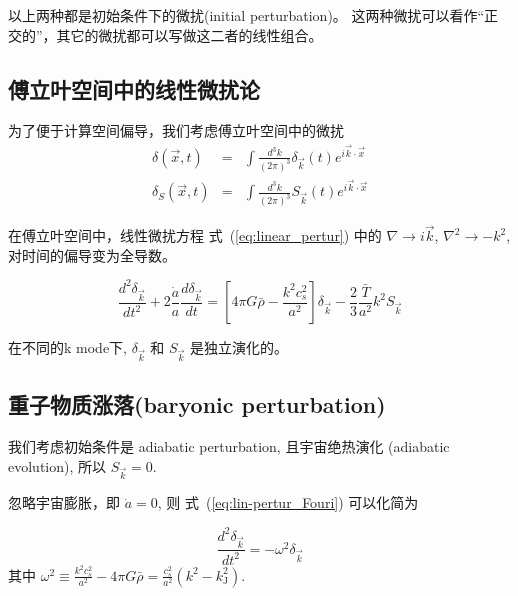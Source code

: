 \documentclass[12pt]{ctexart}
\newcommand{\new}[1]{\textcolor{blue}{#1}}
\newcommand{\refeq}[1]{式~(\ref{#1})}
\begin{document}
以上两种都是初始条件下的微扰(initial perturbation)。
这两种微扰可以看作“正交的”，其它的微扰都可以写做这二者的线性组合。

\subsection{傅立叶空间中的线性微扰论}

为了便于计算空间偏导，我们考虑傅立叶空间中的微扰
\begin{eqnarray}
    \delta\left(\vec{x},t\right) &=& \int \frac{d^3k}{(2\pi)^3} \delta_{\vec{k}}\left(t\right) e^{i\vec{k}\cdot \vec{x}} \\ 
    \delta_S\left(\vec{x},t\right) &=& \int \frac{d^3k}{(2\pi)^3} S_{\vec{k}}\left(t\right) e^{i\vec{k}\cdot \vec{x}}
\end{eqnarray}
\begin{equation}
\end{equation}

在傅立叶空间中，线性微扰方程 \refeq{eq:linear_pertur} 中的 $\nabla \rightarrow i\vec{k}$, $\nabla^2 \rightarrow -k^2$, 对时间的偏导变为全导数。
\begin{shaded}
\begin{equation} \label{eq:lin-pertur_Fouri}
    \frac{d^2 \delta_{\vec{k}}}{dt^2 } + 2\frac{\dot{a}}{a} \frac{d\delta_{\vec{k}}}{dt} = \left[4\pi G \bar{\rho}-\frac{k^2c_s^2}{a^2}\right] \delta_{\vec{k}} -\frac{2}{3}\frac{\bar{T}}{a^2}k^2 S_{\vec{k}}
\end{equation}
\end{shaded}
在不同的k mode下,  $\delta_{\vec{k}}$ 和 $S_{\vec{k}}$ 是独立演化的。

\subsection{重子物质涨落(baryonic perturbation)}
 
我们考虑初始条件是 adiabatic perturbation, 且宇宙绝热演化 (adiabatic evolution), 所以  $S_{\vec{k}}=0$.

忽略宇宙膨胀，即 $\dot{a}=0$, 则 \refeq{eq:lin-pertur_Fouri} 可以化简为

\begin{equation}
    \frac{d^2 \delta_{\vec{k}}}{dt^2} = -\omega^2 \delta_{\vec{k}}
\end{equation}
其中 $\omega^2 \equiv \frac{k^2 c_s^2}{a^2} - 4\pi G \bar{\rho} = \frac{c_s^2}{a^2}\left(k^2 - k_\text{J}^2\right)$. 
\end{document}
